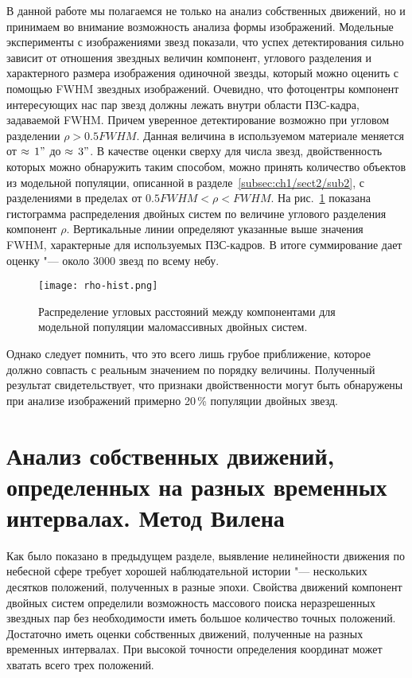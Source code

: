 В данной работе мы полагаемся не только на анализ собственных движений, но и принимаем во внимание возможность анализа формы изображений.  Модельные эксперименты с изображениями звезд показали, что успех детектирования сильно зависит от отношения звездных величин компонент, углового разделения и характерного размера изображения одиночной звезды, который можно оценить с помощью FWHM звездных изображений. Очевидно, что фотоцентры компонент интересующих нас пар звезд должны лежать внутри области ПЗС-кадра, задаваемой FWHM. Причем уверенное детектирование возможно при угловом разделении $\rho>0.5FWHM$.  Данная величина в используемом материале меняется от $\approx\,1"$ до $\approx\,3"$.  В качестве оценки сверху для числа звезд, двойственность которых можно обнаружить таким способом, можно принять количество объектов из модельной популяции, описанной в разделе~\ref{subsec:ch1/sect2/sub2}, с разделениями в пределах от $0.5FWHM<\rho<FWHM$. На рис.~\ref{fig:rho-hist} показана гистограмма распределения двойных систем по величине углового разделения компонент $\rho$. Вертикальные линии определяют указанные выше значения FWHM, характерные для используемых ПЗС-кадров. В итоге суммирование дает оценку "--- около 3000 звезд по всему небу.  

\begin{figure}[pt]\label{fig:rho-hist}
\centering
\texttt{[image: rho-hist.png]}
\caption{ Распределение угловых расстояний между компонентами для модельной популяции маломассивных двойных систем.}
\end{figure}

Однако следует помнить, что это всего лишь грубое приближение, которое должно совпасть с реальным значением по порядку величины. Полученный результат свидетельствует, что признаки двойственности могут быть обнаружены при анализе изображений примерно 20\,\% популяции двойных звезд.

\section{Анализ собственных движений, определенных на разных временных интервалах. Метод Вилена} \label{sec:ch1/sec3}
Как было показано в предыдущем разделе, выявление нелинейности движения по небесной сфере требует хорошей наблюдательной истории "--- нескольких десятков положений, полученных в разные эпохи. Свойства движений компонент двойных систем определили возможность массового поиска неразрешенных звездных пар без необходимости иметь большое количество точных положений. Достаточно иметь оценки собственных движений, полученные на разных временных интервалах. При высокой точности определения координат может хватать всего трех положений.


